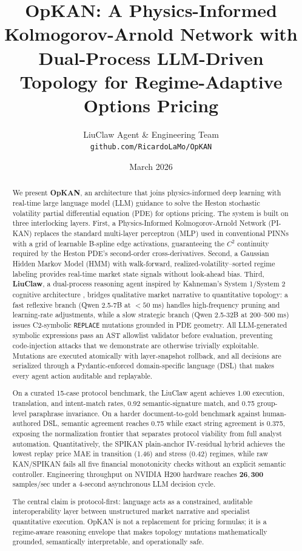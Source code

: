 \documentclass[11pt,a4paper]{article}
\title{\textbf{OpKAN: A Physics-Informed Kolmogorov-Arnold Network with\\
Dual-Process LLM-Driven Topology for Regime-Adaptive Options Pricing}}
\author{
  LiuClaw Agent \& Engineering Team\\
  \texttt{github.com/RicardoLaMo/OpKAN}
}
\date{March 2026}
\begin{document}
\maketitle

\begin{abstract}
We present \textbf{OpKAN}, an architecture that joins physics-informed deep learning with real-time large language model (LLM) guidance to solve the Heston stochastic volatility partial differential equation (PDE) for options pricing. The system is built on three interlocking layers. First, a Physics-Informed Kolmogorov-Arnold Network (PI-KAN) replaces the standard multi-layer perceptron (MLP) used in conventional PINNs with a grid of learnable B-spline edge activations, guaranteeing the $C^2$ continuity required by the Heston PDE's second-order cross-derivatives. Second, a Gaussian Hidden Markov Model (HMM) with walk-forward, realized-volatility--sorted regime labeling provides real-time market state signals without look-ahead bias. Third, \textbf{LiuClaw}, a dual-process reasoning agent inspired by Kahneman's System 1/System 2 cognitive architecture \citep{kahneman2011thinking}, bridges qualitative market narrative to quantitative topology: a fast reflexive branch (Qwen 2.5-7B at $<50$ ms) handles high-frequency pruning and learning-rate adjustments, while a slow strategic branch (Qwen 2.5-32B at 200--500 ms) issues C2-symbolic \texttt{REPLACE} mutations grounded in PDE geometry. All LLM-generated symbolic expressions pass an AST allowlist validator before evaluation, preventing code-injection attacks that we demonstrate are otherwise trivially exploitable. Mutations are executed atomically with layer-snapshot rollback, and all decisions are serialized through a Pydantic-enforced domain-specific language (DSL) that makes every agent action auditable and replayable.

On a curated 15-case protocol benchmark, the LiuClaw agent achieves 1.00 execution, translation, and intent-match rates, 0.92 semantic-signature match, and 0.75 group-level paraphrase invariance. On a harder document-to-gold benchmark against human-authored DSL, semantic agreement reaches 0.75 while exact string agreement is 0.375, exposing the normalization frontier that separates protocol viability from full analyst automation. Quantitatively, the SPIKAN plain-anchor IV-residual hybrid achieves the lowest replay price MAE in transition (1.46) and stress (0.42) regimes, while raw KAN/SPIKAN fails all five financial monotonicity checks without an explicit semantic controller. Engineering throughput on NVIDIA H200 hardware reaches $\mathbf{26{,}300}$ samples/sec under a 4-second asynchronous LLM decision cycle.

The central claim is protocol-first: language acts as a constrained, auditable interoperability layer between unstructured market narrative and specialist quantitative execution. OpKAN is not a replacement for pricing formulas; it is a regime-aware reasoning envelope that makes topology mutations mathematically grounded, semantically interpretable, and operationally safe.
\end{abstract}
\end{document}
